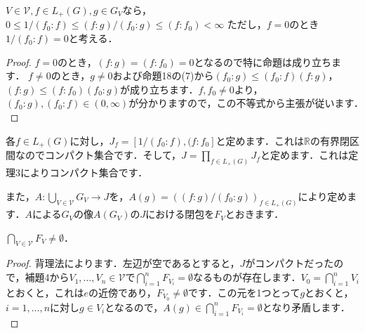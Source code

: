 \begin{prop}
$V \in \mathscr{V}, f \in L_{+}(G), g \in G_{V}$なら，$0 \le 1/( f_0 \colon f ) \le ( f \colon g ) / ( f_0 \colon g ) \le ( f \colon f_0 ) < \infty$
ただし，$f=0$のとき$1/( f_0 \colon f ) = 0$と考える．
\end{prop}
\begin{proof}
$f=0$のとき，$( f \colon g ) = ( f \colon f_0 ) = 0$となるので特に命題は成り立ちます．
$f \ne 0$のとき，$g \neq 0$および命題18の(7)から$(f_0 \colon g) \le (f_0 \colon f) (f \colon g )$，$ (f \colon g) \le (f \colon f_0 ) (f_0 \colon g )$が成り立ちます．$f, f_0 \neq 0$より，$(f_0 \colon g), (f_0 \colon f) \in (0, \infty)$が分かりますので，この不等式から主張が従います．　
\end{proof}

各$f \in L_{+}(G)$に対し，$J_{f}=[1/ ( f_0 \colon f ) , ( f \colon f_{0} ]$と定めます．これは$\mathbb{R}$の有界閉区間なのでコンパクト集合です．そして，$J=\prod_{f \in L_{+}(G)} J_f$と定めます．これは定理3によりコンパクト集合です．

また，$A \colon \bigcup_{V \in \mathscr{V}}G_V \to J$を，$A(g)=( ( f \colon g ) / ( f_0 \colon g ) )_{f \in L_{+}(G)}$により定めます．$A$による$G_V$の像$A(G_V)$の$J$における閉包を$F_V$とおきます．
\begin{prop}
$\bigcap_{V \in \mathscr{V}}F_V \neq \emptyset$．
\end{prop}
\begin{proof}
背理法によります．左辺が空であるとすると，$J$がコンパクトだったので，補題4から$V_1, \ldots , V_n \in \mathscr{V}$で$\bigcap_{i=1}^{n}F_{V_i}=\emptyset$なるものが存在します．$V_0=\bigcap_{i=1}^{n}V_i$とおくと，これは$e$の近傍であり，$F_{V_0} \neq \emptyset$です．この元を1つとって$g$とおくと，$i=1, \ldots , n$に対し$g \in V_i$となるので，$A(g) \in \bigcap_{i=1}^{n}F_{V_i}=\emptyset$となり矛盾します．　
\end{proof}

